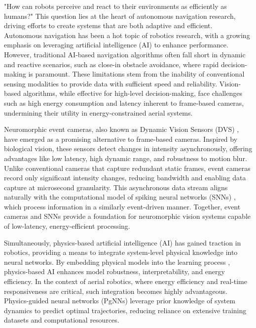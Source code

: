 "How can robots perceive and react to their environments as efficiently as humans?" This question lies at the heart of autonomous navigation research, driving efforts to create systems that are both adaptive and efficient. Autonomous navigation has been a hot topic of robotics research, with a growing emphasis on leveraging artificial intelligence (AI) to enhance performance. However, traditional AI-based navigation algorithms often fall short in dynamic and reactive scenarios, such as close-in obstacle avoidance, where rapid decision-making is paramount. These limitations stem from the inability of conventional sensing modalities to provide data with sufficient speed and reliability. Vision-based algorithms, while effective for high-level decision-making, face challenges such as high energy consumption and latency inherent to frame-based cameras, undermining their utility in energy-constrained aerial systems.

Neuromorphic event cameras, also known as Dynamic Vision Sensors (DVS) \cite{dvs1,dvs2,dvs3}, have emerged as a promising alternative to frame-based cameras. Inspired by biological vision, these sensors detect changes in intensity asynchronously, offering advantages like low latency, high dynamic range, and robustness to motion blur. Unlike conventional cameras that capture redundant static frames, event cameras record only significant intensity changes, reducing bandwidth and enabling data capture at microsecond granularity. This asynchronous data stream aligns naturally with the computational model of spiking neural networks (SNNs) \cite{lif,lee2020spike}, which process information in a similarly event-driven manner. Together, event cameras and SNNs provide a foundation for neuromorphic vision systems capable of low-latency, energy-efficient processing.

Simultaneously, physics-based artificial intelligence (AI) has gained traction in robotics, providing a means to integrate system-level physical knowledge into neural networks. By embedding physical models into the learning process \cite{raissi2019physics,karniadakis2021physics}, physics-based AI enhances model robustness, interpretability, and energy efficiency. In the context of aerial robotics, where energy efficiency and real-time responsiveness are critical, such integration becomes highly advantageous. Physics-guided neural networks (PgNNs) leverage prior knowledge of system dynamics \cite{NICODEMUS2022331,rampnet,chee2022knode} to predict optimal trajectories, reducing reliance on extensive training datasets and computational resources.

